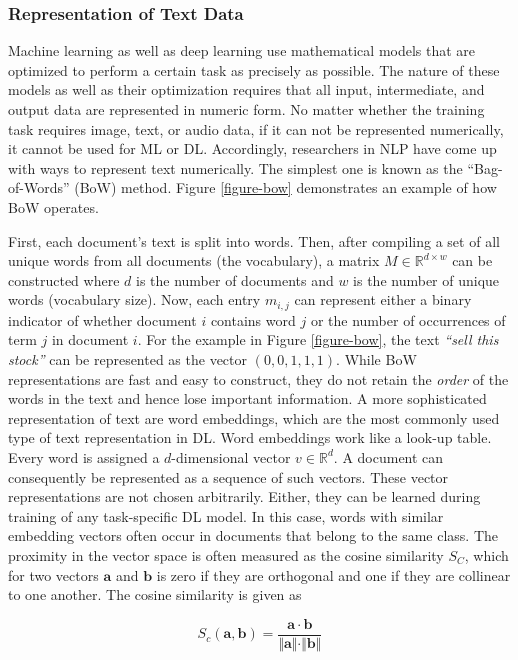 \subsubsection{Representation of Text Data}
\label{section-text-repr-theory}
Machine learning as well as deep learning use mathematical models that are optimized to perform a certain task as precisely as possible. The nature of these models as well as their optimization requires that all input, intermediate, and output data are represented in numeric form. No matter whether the training task requires image, text, or audio data, if it can not be represented numerically, it cannot be used for ML or DL. Accordingly, researchers in NLP have come up with ways to represent text numerically. The simplest one is known as the ``Bag-of-Words'' (BoW) method. Figure \ref{figure-bow} demonstrates an example of how BoW operates.



 First, each document's text is split into words. Then, after compiling a set of all unique words from all documents (the vocabulary), a matrix $M \in \mathbb{R}^{d \times w}$ can be constructed where $d$ is the number of documents and $w$ is the number of unique words (vocabulary size). Now, each entry $m_{i,j}$ can represent either a binary indicator of whether document $i$ contains word $j$ or the number of occurrences of term $j$ in document $i$. For the example in Figure \ref{figure-bow}, the text \emph{``sell this stock''} can be represented as the vector $(0,0,1,1,1)$. While BoW representations are fast and easy to construct, they do not retain the \emph{order} of the words in the text and hence lose important information. A more sophisticated representation of text are word embeddings, which are the most commonly used type of text representation in DL. Word embeddings work like a look-up table. Every word is assigned a $d$-dimensional vector $v \in \mathbb{R}^{d}$. A document can consequently be represented as a sequence of such vectors. These vector representations are not chosen arbitrarily. Either, they can be learned during training of any task-specific DL model. In this case, words with similar embedding vectors often occur in documents that belong to the same class. The proximity in the vector space is often measured as the cosine similarity $S_C$, which for two vectors $\bm{a}$ and $\bm{b}$ is zero if they are orthogonal and one if they are collinear to one another. The cosine similarity is given as

\begin{equation}
	S_c(\bm{a}, \bm{b}) = \frac{\bm{a} \cdot \bm{b}}{\Vert \bm{a} \Vert \cdot \Vert \bm{b} \Vert}
\end{equation} 

